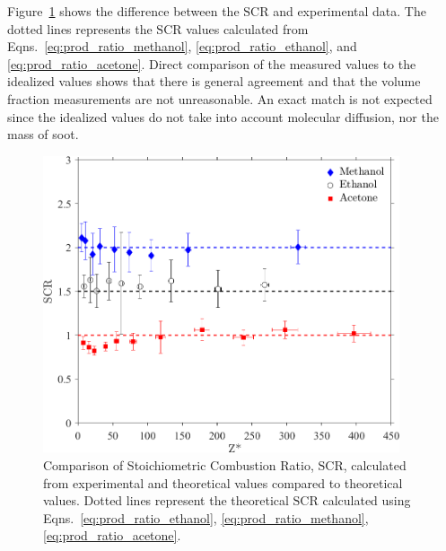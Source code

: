\documentclass[12pt]{article}
\begin{document}
Figure~\ref{fig:SCR} shows the difference between the $\text{SCR}$ and experimental data. The dotted lines represents the $\text{SCR}$ values calculated from Eqns.~\ref{eq:prod_ratio_methanol}, \ref{eq:prod_ratio_ethanol}, and \ref{eq:prod_ratio_acetone}. Direct comparison of the measured values to the idealized values shows that there is general agreement and that the volume fraction measurements are not unreasonable. An exact match is not expected since the idealized values do not take into account molecular diffusion, nor the mass of soot. 
\begin{figure}[h!]
	\centering
\includegraphics[width=10.5cm, keepaspectratio]{Prod_ratio_Comparison.png}
	\caption[Stoichiometric Combustion Ratio calculated from experimental values compared to theoretical values]{Comparison of Stoichiometric Combustion Ratio, $\text{SCR}$, calculated from experimental and theoretical values compared to theoretical values. Dotted lines represent the theoretical $\text{SCR}$ calculated using Eqns.~\ref{eq:prod_ratio_ethanol}, \ref{eq:prod_ratio_methanol}, \ref{eq:prod_ratio_acetone}.}
	\label{fig:SCR}
\end{figure}
\end{document}
